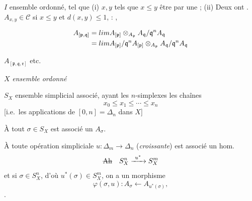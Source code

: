 \documentclass[11pt,a4paper]{article}
\begin{document}
$I$ ensemble ordonné, tel que
(i)   \struck{\ill{}} $x, y$ tels que
$x \leq y$  être  par une
  ;
(ii) Deux   ont 
.
   
$A_{x,y} \in \mathcal{C}$ si $x \leq y$ et $d(x,y) \leq 1$, \ill{} \ill{}
\ill{} \struck{\ill{}, \ill{}} \ill{} : \ill{} \ill{} \ill{},

\[
\begin{aligned}
A_{[\mathfrak{p},\mathfrak{q}]} &= \varprojlim A_{[\mathfrak{p}]} \otimes_{A_{\mathfrak{p}}} A_{\mathfrak{q}}/\mathfrak{q}^{n} A_{\mathfrak{q}} \\
&= \varprojlim A_{[\mathfrak{p}]}/\mathfrak{q}^{n} A_{[\mathfrak{p}]} \otimes_{A_{\mathfrak{p}}} A_{\mathfrak{q}}/\mathfrak{q}^{n} A_{\mathfrak{q}}
\end{aligned}
\]

$A_{[\mathfrak{p},\mathfrak{q},\mathfrak{r}]}$ \quad etc.

$X$ \emph{ensemble ordonné}

$S_X$ ensemble simplicial associé, ayant les $n$-simplexes 
les chaînes
\[
x_0 \leq x_1 \leq \cdots \leq x_n
\]
[i.e.\ les applications  de $[0,n] = \Delta_n$ dans
$X$]

À tout $\sigma \in S_X$ est associé un $A_\sigma$.

À toute opération  simpliciale
$u : \Delta_m \to \Delta_n$ (\emph{croissante}) est associé un hom.
\[
\text{\struck{Ah}}\quad S_X^{n} \xrightarrow{\ u^{*}\ } S_X^{m}
\]
et si $\sigma \in S_X^n$, d'où $u^{*}(\sigma) \in S_X^m$, on a un
morphisme
\[
\varphi(\sigma, u) : A_\sigma \longleftarrow A_{u^{*}(\sigma)},
\]
  .
\end{document}

